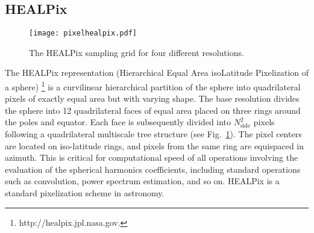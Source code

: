 \newpage
\subsection{HEALPix}
\label{healpix}

\begin{figure}[htb]
\centering
\texttt{[image: pixelhealpix.pdf]}
\caption{The HEALPix sampling grid for four different resolutions.}
\label{pixelhealpix}
\end{figure}

The HEALPix representation (Hierarchical Equal Area isoLatitude Pixelization of a sphere) \citep{pixel:healpix}\footnote{http://healpix.jpl.nasa.gov.} is a curvilinear hierarchical partition of the sphere into quadrilateral pixels of exactly equal area but with varying shape. The base resolution divides the sphere into 12 quadrilateral faces of equal area placed on three rings around the poles and equator. Each face is subsequently divided into $N_{\mathrm{side}}^{2}$ pixels following a quadrilateral multiscale  tree structure (see Fig.~\ref{pixelhealpix}). The pixel centers are located on iso-latitude rings, and pixels from the same ring are equispaced in azimuth. This is critical for computational speed of all operations involving the evaluation of the spherical harmonics coefficients, including standard operations such as convolution, power spectrum estimation, and so on.  
HEALPix is a standard pixelization scheme in astronomy.
 


